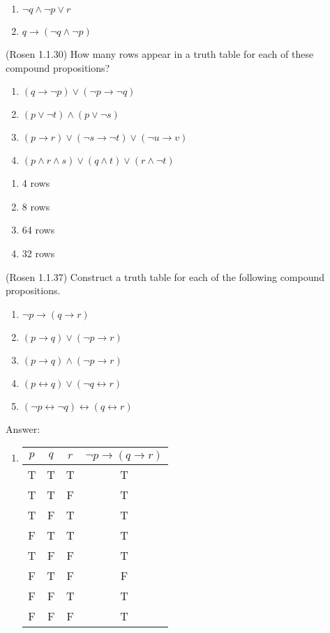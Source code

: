 \documentclass[10pt]{exam}
\begin{document}
\begin{questions}
\begin{enumerate}
  \item $\neg q \land \neg p \lor r$
  \item $q \rightarrow( \neg q \land \neg p) $
\end{enumerate}

\question[4] (Rosen 1.1.30) How many rows appear in a truth table for each of these compound propositions?
\begin{enumerate} [label=(\alph*)]
  \item $(q \rightarrow \neg p) \vee (\neg p \rightarrow \neg q)$
  \item $(p \vee \neg t) \wedge (p \vee \neg s)$
  \item $(p \rightarrow r) \vee (\neg s \rightarrow \neg t) \vee ( \neg u \rightarrow v)$
  \item $(p \wedge r \wedge s) \vee (q \wedge t) \vee (r \wedge \neg t)$
\end{enumerate}

\begin{enumerate}
  \item 4 rows
  \item 8 rows
  \item 64 rows
  \item 32 rows
\end{enumerate}

\question[10] (Rosen 1.1.37) Construct a truth table for each of the following compound propositions.
\begin{enumerate} [label=(\alph*)]
  \item $\neg p \rightarrow (q \rightarrow r)$
  \item $(p \rightarrow q) \lor (\neg p \rightarrow r)$
  \item $(p \rightarrow q) \land (\neg p \rightarrow r)$
  \item $(p \leftrightarrow q) \lor (\neg q \leftrightarrow r)$
  \item $(\neg p \leftrightarrow \neg q) \leftrightarrow (q \leftrightarrow r)$
\end{enumerate}

Answer:
\begin{enumerate}
  \item 
  \begin{table}[h!]
  \centering 
  \begin{tabular}{|c|c|c|c|}
  \hline
  $p$ & $q$ & $r$ & $\neg p \rightarrow (q \rightarrow r)$ \\
  \hline
  T & T & T & T\\
  T & T & F & T\\
  T & F & T & T\\
  F & T & T & T\\
  T & F & F & T\\
  F & T & F & F\\
  F & F & T & T\\
  F & F & F & T\\
  \hline
  \end{tabular}
  \end{table}


\end{enumerate}
\end{questions}
\end{document}
